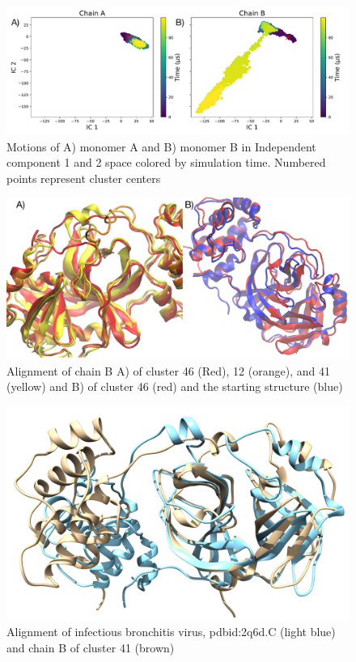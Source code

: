 \documentclass{biophys-new}
\begin{document}
\begin{figure}[hbt!]
\centering
\graphicspath{ {./figures/} }
\includegraphics[width=0.6\linewidth]{fig_1_fdiscolortime_ic2_label.pdf}
\caption{Motions of A) monomer A and B) monomer B in Independent component 1 and 2 space colored by simulation time. Numbered points represent cluster centers}
\label{fig:view}
\end{figure}

\begin{figure}[hbt!]
\graphicspath{ {./figures/} }
\centering
\includegraphics[width=0.6\linewidth]{fig2_IC1_align.pdf}
\caption{Alignment of chain B A) of cluster 46 (Red), 12 (orange), and 41 (yellow) and B) of cluster 46 (red) and the starting structure (blue)}
\label{fig:view}
\end{figure}

\begin{figure}[hbt!]
\centering
\graphicspath{ {./images/} }
\includegraphics[width=0.6\linewidth]{blue-2Q6D-C-brown-cluster-41-better-align-2.png}
\caption{Alignment of infectious bronchitis virus, pdbid:2q6d.C (light blue) and chain B of cluster 41 (brown)}
\label{fig:view}
\end{figure}
\end{document}
